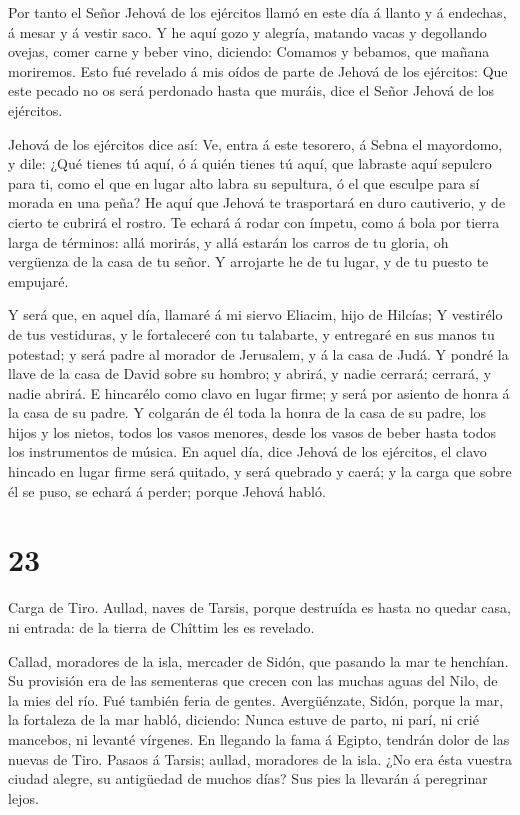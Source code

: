 Por tanto el Señor Jehová de los ejércitos llamó en este
día á llanto y á endechas, á mesar y á vestir saco.  Y he
aquí gozo y alegría, matando vacas y degollando ovejas, comer carne y
beber vino, diciendo: Comamos y bebamos, que mañana moriremos.
 Esto fué revelado á mis oídos de parte de Jehová de los
ejércitos: Que este pecado no os será perdonado hasta que muráis, dice
el Señor Jehová de los ejércitos.

 Jehová de los ejércitos dice así: Ve, entra á este
tesorero, á Sebna el mayordomo, y dile:  ¿Qué tienes tú
aquí, ó á quién tienes tú aquí, que labraste aquí sepulcro para ti, como
el que en lugar alto labra su sepultura, ó el que esculpe para sí morada
en una peña?  He aquí que Jehová te trasportará en duro
cautiverio, y de cierto te cubrirá el rostro.  Te echará á
rodar con ímpetu, como á bola por tierra larga de términos: allá
morirás, y allá estarán los carros de tu gloria, oh vergüenza de la casa
de tu señor.  Y arrojarte he de tu lugar, y de tu puesto te
empujaré.

 Y será que, en aquel día, llamaré á mi siervo Eliacim,
hijo de Hilcías;  Y vestirélo de tus vestiduras, y le
fortaleceré con tu talabarte, y entregaré en sus manos tu potestad; y
será padre al morador de Jerusalem, y á la casa de Judá.  Y
pondré la llave de la casa de David sobre su hombro; y abrirá, y nadie
cerrará; cerrará, y nadie abrirá.  E hincarélo como clavo
en lugar firme; y será por asiento de honra á la casa de su padre.
 Y colgarán de él toda la honra de la casa de su padre, los
hijos y los nietos, todos los vasos menores, desde los vasos de beber
hasta todos los instrumentos de música.  En aquel día, dice
Jehová de los ejércitos, el clavo hincado en lugar firme será quitado, y
será quebrado y caerá; y la carga que sobre él se puso, se echará á
perder; porque Jehová habló.

\hypertarget{section-22}{%
\section{23}\label{section-22}}

 Carga de Tiro. Aullad, naves de Tarsis, porque destruída es
hasta no quedar casa, ni entrada: de la tierra de Chîttim les es
revelado.

 Callad, moradores de la isla, mercader de Sidón, que
pasando la mar te henchían.  Su provisión era de las
sementeras que crecen con las muchas aguas del Nilo, de la mies del río.
Fué también feria de gentes.  Avergüénzate, Sidón, porque la
mar, la fortaleza de la mar habló, diciendo: Nunca estuve de parto, ni
parí, ni crié mancebos, ni levanté vírgenes.  En llegando la
fama á Egipto, tendrán dolor de las nuevas de Tiro.  Pasaos
á Tarsis; aullad, moradores de la isla.  ¿No era ésta
vuestra ciudad alegre, su antigüedad de muchos días? Sus pies la
llevarán á peregrinar lejos.

